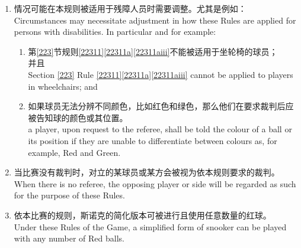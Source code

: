 \begin{enumerate}
    \item 情况可能在本规则被适用于残障人员时需要调整。尤其是例如：\\
    Circumstances may necessitate adjustment in how these Rules are applied for persons with disabilities. In particular and for example:
    \begin{enumerate}
        \item 第\ref{223}节规则\ref{22311}\ref{22311a}\ref{22311aiii}不能被适用于坐轮椅的球员；\\并且\\
        Section \ref{223} Rule \ref{22311}\ref{22311a}\ref{22311aiii} cannot be applied to players in wheelchairs; and
        \item 如果球员无法分辨不同颜色，比如红色和绿色，那么他们在要求裁判后应被告知球的颜色或其位置。\\
        a player, upon request to the referee, shall be told the colour of a ball or its position if they are unable to differentiate between colours as, for example, Red and Green.
    \end{enumerate}
    \item 当比赛没有裁判时，对立的某球员或某方会被视为依本规则要求的裁判。\\
    When there is no referee, the opposing player or side will be regarded as such for the purpose of these Rules.
    \item 依本比赛的规则，斯诺克的简化版本可被进行且使用任意数量的红球。\\
    Under these Rules of the Game, a simplified form of snooker can be played with any number of Red balls.
\end{enumerate}
